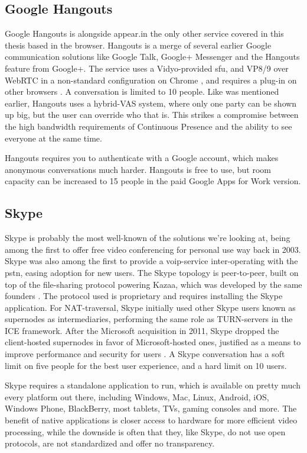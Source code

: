 \subsection{Google Hangouts}

Google Hangouts is alongside appear.in the only other service covered in this thesis based in the browser. Hangouts is a merge of several earlier Google communication solutions like Google Talk, Google+ Messenger and the Hangouts feature from Google+. The service uses a Vidyo-provided \gls{sfu}, and VP8/9 over WebRTC in a non-standard configuration on Chrome \cite{hangouts-webrtc}, and requires a plug-in on other browsers \cite{google-hangouts-support}. A conversation is limited to 10 people. Like was mentioned earlier, Hangouts uses a hybrid-VAS system, where only one party can be shown up big, but the user can override who that is. This strikes a compromise between the high bandwidth requirements of Continuous Presence and the ability to see everyone at the same time.

Hangouts requires you to authenticate with a Google account, which makes anonymous conversations much harder. Hangouts is free to use, but room capacity can be increased to 15 people in the paid Google Apps for Work version.


\subsection{Skype}

Skype is probably the most well-known of the solutions we're looking at, being among the first to offer free video conferencing for personal use way back in 2003. Skype was also among the first to provide a \gls{voip}-service inter-operating with the \gls{pstn}, easing adoption for new users. The Skype topology is peer-to-peer, built on top of the file-sharing protocol powering Kazaa, which was developed by the same founders \cite{skype-history}. The protocol used is proprietary and requires installing the Skype application. For NAT-traversal, Skype initially used other Skype users known as supernodes as intermediaries, performing the same role as TURN-servers in the ICE framework. After the Microsoft acquisition in 2011, Skype dropped the client-hosted supernodes in favor of Microsoft-hosted ones, justified as a means to improve performance and security for users \cite{skype-topo-change}. A Skype conversation has a soft limit on five people for the best user experience, and a hard limit on 10 users.

Skype requires a standalone application to run, which is available on pretty much every platform out there, including Windows, Mac, Linux, Android, iOS, Windows Phone, BlackBerry, most tablets, TVs, gaming consoles and more. The benefit of native applications is closer access to hardware for more efficient video processing, while the downside is often that they, like Skype, do not use open protocols, are not standardized and offer no transparency.


